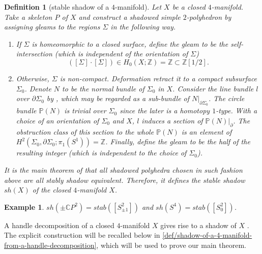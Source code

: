 \documentclass[12pt]{extarticle}
\numberwithin{equation}{section} %
\theoremstyle{mystyle}
\newtheorem{definition}[equation]{Definition}
\newtheorem{example}[equation]{Example}
\begin{document}
\begin{definition}[stable shadow of a $4$-manifold]\label{def/stable-shadow-of-a-4-manifold}
  Let $X$ be a closed $4$-manifold. Take a skeleton $P$ of $X$
  and construct a shadowed simple $2$-polyhedron by assigning
  gleams to the regions $\Sigma$ in the following way.
  \begin{enumerate}
    \item If $\Sigma$ is homeomorphic to a closed surface, define
          the gleam to be the self-intersection (which is
          independent of the orientation of $\Sigma$)
          $$([\Sigma] \cdot [\Sigma]) \in H_{0}(X;\mathbb{Z}) = \mathbb{Z} \subset \mathbb{Z}\left[1/2\right].$$
    \item Otherwise, $\Sigma$ is non-compact. Deformation retract
          it to a compact subsurface $\Sigma_{0}$. Denote $N$ to
          be the normal bundle of $\Sigma_{0}$ in $X$. Consider
          the line bundle $l$ over $\partial \Sigma_{0}$ by
          \cite[section VIII.6.2,
          p.397]{turaev-qiok-3-manifolds}, which may be regarded
          as a sub-bundle of $N|_{\partial \Sigma_{0}}$. The
          circle bundle $\mathbb{P}(N)$ is trivial over
          $\Sigma_{0}$ since the later is a homotopy $1$-type.
          With a choice of an orientation of $\Sigma_{0}$ and
          $X$, $l$ induces a section of
          $\mathbb{P}(N)|_{\partial}$. The obstruction class of
          this section to the whole $\mathbb{P}(N)$ is an element
          of
          $H^{2}(\Sigma_{0}, \partial \Sigma_{0}; \pi_{1}(S^{1})) = \mathbb{Z}$.
          Finally, define the gleam to be the half of the
          resulting integer (which is independent to the choice
          of $\Sigma_{0}$).
  \end{enumerate}
  It is the main theorem of \cite[section
  IX.1.7]{turaev-qiok-3-manifolds} that all shadowed polyhedra
  chosen in such fashion above are all stably shadow equivalent.
  Therefore, it defines the stable shadow $sh(X)$ of the closed
  $4$-manifold $X$.
\end{definition}

\begin{example}
  $sh(\pm\mathbb{C}P^{2}) = stab([S^{2}_{\pm 1}])$ and
  $sh(S^{4}) = stab([S^{2}_{0}])$.
\end{example}

\noindent A handle decomposition of a closed $4$-manifold $X$
gives rise to a shadow of $X$ \cite[section
IX.4]{turaev-qiok-3-manifolds}. The explicit construction will be
recalled below in
\ref{def/shadow-of-a-4-manifold-from-a-handle-decomposition},
which will be used to prove our main theorem.
\end{document}
